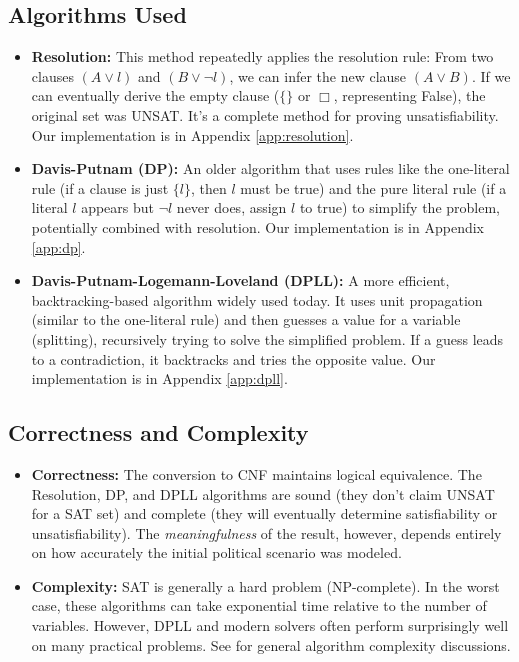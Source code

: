 \documentclass[11pt, a4paper]{article}
\begin{document}
\subsection*{Algorithms Used}

\begin{itemize}
    \item \textbf{Resolution:} This method \cite{Robinson1965} repeatedly applies the resolution rule: From two clauses $(A \vee l)$ and $(B \vee \neg l)$, we can infer the new clause $(A \vee B)$. If we can eventually derive the empty clause ($\{\}$ or $\Box$, representing False), the original set was UNSAT. It's a complete method for proving unsatisfiability. Our implementation is in Appendix \ref{app:resolution}.
    \item \textbf{Davis-Putnam (DP):} An older algorithm \cite{DavisPutnam1960} that uses rules like the one-literal rule (if a clause is just $\{l\}$, then $l$ must be true) and the pure literal rule (if a literal $l$ appears but $\neg l$ never does, assign $l$ to true) to simplify the problem, potentially combined with resolution. Our implementation is in Appendix \ref{app:dp}.
    \item \textbf{Davis-Putnam-Logemann-Loveland (DPLL):} A more efficient, backtracking-based algorithm \cite{DPLL1962} widely used today. It uses unit propagation (similar to the one-literal rule) and then guesses a value for a variable (splitting), recursively trying to solve the simplified problem. If a guess leads to a contradiction, it backtracks and tries the opposite value. Our implementation is in Appendix \ref{app:dpll}.
\end{itemize}

\subsection*{Correctness and Complexity}

\begin{itemize}
    \item \textbf{Correctness:} The conversion to CNF maintains logical equivalence. The Resolution, DP, and DPLL algorithms are sound (they don't claim UNSAT for a SAT set) and complete (they will eventually determine satisfiability or unsatisfiability). The \textit{meaningfulness} of the result, however, depends entirely on how accurately the initial political scenario was modeled.
    \item \textbf{Complexity:} SAT is generally a hard problem (NP-complete). In the worst case, these algorithms can take exponential time relative to the number of variables. However, DPLL and modern solvers often perform surprisingly well on many practical problems. See \cite{Cormen1996} for general algorithm complexity discussions.
\end{itemize}
\end{document}
